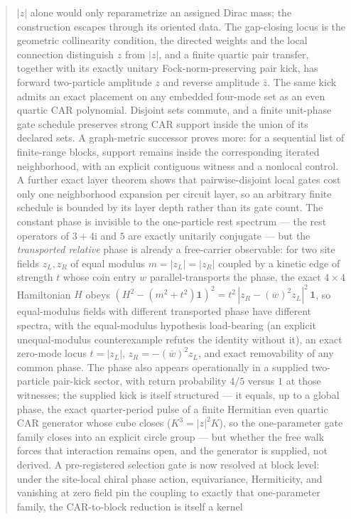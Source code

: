 \documentclass[11pt]{article}
\newcommand{\ii}{\mathrm{i}}
\newcommand{\id}{\mathbf{1}}
\begin{document}
\begin{abstract}
$|z|$ alone would only reparametrize an assigned Dirac
mass; the construction escapes through its oriented data.  The gap-closing
locus is the geometric collinearity condition, the directed weights and the
local connection distinguish $z$ from $|z|$, and a finite quartic pair
transfer, together with its exactly unitary Fock-norm-preserving pair kick,
has forward two-particle amplitude $z$ and reverse amplitude $\bar z$.  The
same kick admits an exact placement on any embedded four-mode set as an even
quartic CAR polynomial.  Disjoint sets commute, and a finite unit-phase gate
schedule preserves strong CAR support inside the union of its declared sets.
A graph-metric successor proves more: for a sequential list of finite-range
blocks, support remains inside the corresponding iterated neighborhood, with
an explicit contiguous witness and a nonlocal control.  A further exact
layer theorem shows that pairwise-disjoint local gates cost only one
neighborhood expansion per circuit layer, so an arbitrary finite schedule is
bounded by its layer depth rather than its gate count.  The
constant phase is invisible to the one-particle rest spectrum --- the rest
operators of $3+4\ii$ and $5$ are exactly unitarily conjugate --- but the
\emph{transported relative} phase is already a free-carrier observable: for
two site fields $z_L,z_R$ of equal modulus $m=|z_L|=|z_R|$ coupled by a
kinetic edge of strength $t$ whose coin entry $w$ parallel-transports the
phase, the exact $4\times4$ Hamiltonian $H$ obeys
$(H^2-(m^2+t^2)\id)^2=t^2\,|z_R-(\overline w)^2z_L|^2\,\id$, so
equal-modulus fields with different transported phase have different
spectra, with the equal-modulus hypothesis load-bearing (an explicit
unequal-modulus counterexample refutes the identity without it), an exact
zero-mode locus $t=|z_L|$, $z_R=-(\overline w)^2z_L$, and exact removability
of any common phase.  The phase also appears operationally in a supplied
two-particle pair-kick sector, with return probability $4/5$ versus $1$ at
those witnesses; the supplied kick is itself structured --- it equals, up
to a global phase, the exact quarter-period pulse of a finite Hermitian
even quartic CAR generator whose cube closes ($K^3=|z|^2K$), so the
one-parameter gate family closes into an explicit circle group --- but whether the free
walk forces that interaction remains open, and the generator is supplied,
not derived.  A pre-registered selection gate is now resolved at block
level: under the site-local chiral phase action, equivariance,
Hermiticity, and vanishing at zero field pin the coupling to exactly
that one-parameter family, the CAR-to-block reduction is itself a kernel

\end{abstract}
\end{document}

